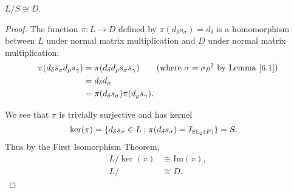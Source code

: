 \begin{lemma}
\label{SpecialSubgroups.D_join_S_quot_S_subgroupOf_D_join_S_mulEquiv_D_subgroupOf_D_join_S}
\leanok
    $L / S \cong D$.
\end{lemma}

\begin{proof} 
The function $\pi: L \rightarrow D$ defined by $\pi(d_\delta s_\sigma) = d_\delta$ is a homomorphism between $L$ under normal matrix multiplication and $D$ under normal matrix multiplication:
\begin{align*} \pi(d_\delta s_\sigma d_\rho s_\gamma) &= \pi(d_\delta d_\rho s_\sigma s_\gamma) \tag{where $\sigma = \sigma \rho^{2}$ by Lemma \ref{6.1}}
\\ &= d_\delta d_\rho
\\ &= \pi(d_\delta s_\sigma)\pi(d_\rho s_\gamma).
\end{align*}

We see that $\pi$ is trivially surjective and has kernel
\begin{align*}  \ker(\pi) &= \{ d_\delta s_\sigma \in L : \pi(d_\delta s_\sigma) = I_{\operatorname{SL}_2(F)}\} = S.
\end{align*}
Thus by the First Isomorphism Theorem,
\begin{align*} L / \ker(\pi) &\cong \text{Im}(\pi), \\
L / &\cong D.
\end{align*}

\end{proof}

